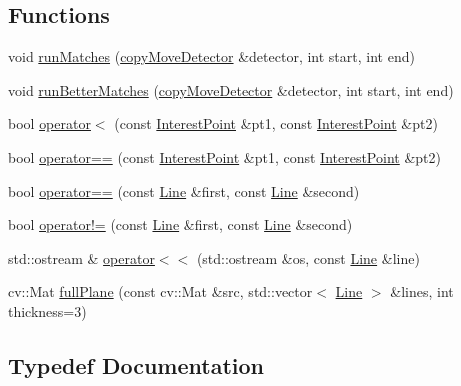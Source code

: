 \subsection*{Functions}
\begin{DoxyCompactItemize}
\item 
void \hyperlink{namespacedefals_a3c45e4d818c6b54d5df0e9aa914c8266}{run\+Matches} (\hyperlink{classdefals_1_1copy_move_detector}{copy\+Move\+Detector} \&detector, int start, int end)
\item 
void \hyperlink{namespacedefals_aec8e056bd901239f1b5fe64dd0a1645f}{run\+Better\+Matches} (\hyperlink{classdefals_1_1copy_move_detector}{copy\+Move\+Detector} \&detector, int start, int end)
\item 
bool \hyperlink{namespacedefals_a6dcf52529b875f27e22b256402e7674f}{operator$<$} (const \hyperlink{classdefals_1_1_interest_point}{Interest\+Point} \&pt1, const \hyperlink{classdefals_1_1_interest_point}{Interest\+Point} \&pt2)
\item 
bool \hyperlink{namespacedefals_a494f95c79cc46c5c71655a0de4b865f1}{operator==} (const \hyperlink{classdefals_1_1_interest_point}{Interest\+Point} \&pt1, const \hyperlink{classdefals_1_1_interest_point}{Interest\+Point} \&pt2)
\item 
bool \hyperlink{namespacedefals_a4c55b460a9efaca04446cfddd1c947f6}{operator==} (const \hyperlink{classdefals_1_1_line}{Line} \&first, const \hyperlink{classdefals_1_1_line}{Line} \&second)
\item 
bool \hyperlink{namespacedefals_a56782f10ddcb64e96fb17b2ee89fe6c3}{operator!=} (const \hyperlink{classdefals_1_1_line}{Line} \&first, const \hyperlink{classdefals_1_1_line}{Line} \&second)
\item 
std\+::ostream \& \hyperlink{namespacedefals_a41fe3a74a9f03aa762cd1723284947f8}{operator$<$$<$} (std\+::ostream \&os, const \hyperlink{classdefals_1_1_line}{Line} \&line)
\item 
cv\+::\+Mat \hyperlink{namespacedefals_a9b63764779b202012956ad5bb5d24442}{full\+Plane} (const cv\+::\+Mat \&src, std\+::vector$<$ \hyperlink{classdefals_1_1_line}{Line} $>$ \&lines, int thickness=3)
\end{DoxyCompactItemize}


\subsection{Typedef Documentation}
\mbox{\label{namespacedefals_a93b34e2e4f989ac1ebef9f660cf3a303}} 
